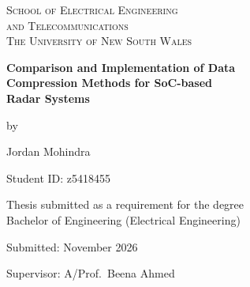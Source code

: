 \documentclass[11pt,a4paper]{report}
\begin{document}
\begin{titlepage}
\centering
\vspace*{8mm}
{\small\scshape School of Electrical Engineering\\and Telecommunications\\
The University of New South Wales\par}
\vspace{30mm}
{\LARGE\bfseries Comparison and Implementation of Data\\[4pt]
Compression Methods for SoC-based\\[4pt] Radar Systems\par}
\vspace{18mm}
{\large by\par}
\vspace{4mm}
{\Large Jordan Mohindra\par}
\vspace{3mm}
{\normalsize Student ID: z5418455\par}
\vspace{25mm}
{\normalsize Thesis submitted as a requirement for the degree\\
Bachelor of Engineering (Electrical Engineering)\par}
\vspace{20mm}
{\normalsize Submitted: November 2026\par}
\vspace{4mm}
{\normalsize Supervisor: A/Prof.\ Beena Ahmed\par}
\vfill
\end{titlepage}

\setcounter{page}{1}



\tableofcontents
\listoffigures
\listoftables

\cleardoublepage
{}
\setcounter{page}{1}















\appendix

\end{document}
